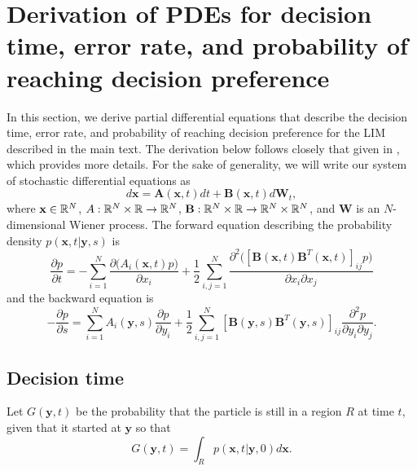\documentclass{article}
\newcommand{\mb}{\mathbf}
\begin{document}
\section{Derivation of PDEs for decision time, error rate, and probability of reaching decision preference \label{pdes_deriv}}
In this section, we derive partial differential equations that describe the decision time, error rate, and probability of reaching decision preference for the LIM described in the main text. The derivation below follows closely that given in \cite{Gardiner:2009fk}, which provides more details.
For the sake of generality, we will write our system of stochastic differential equations as
\begin{equation*}
d{\mathbf x} ={\mb A}({\mb x},t)dt+{\mb B}({\mb x},t)d{\mb W}_t,%
\end{equation*}
where ${\mb x}\in\R^N$, $A:{\mathbb{R}}^N\times {\mathbb{R}}\to{\mathbb{R}}^N$, ${\mb B}:\R^N\times\R\to\R^N\times\R^N$, and ${\mb W}$ is an $N$-dimensional Wiener process. The forward equation describing the probability density $p({\mb x},t|{\mb y},s)$ is 
\begin{equation}
\frac{\partial p}{\partial t} =-\sum_{i=1}^N\frac{\partial \big(A_i({\mb x},t)p\big)}{\partial x_i}+\frac{1}{2}\sum_{i,j=1}^N\frac{\partial^2\big([{\mb B}({\mb x},t){\mb B}^T({\mb x},t)]_{ij}p\big)}{\partial x_i\partial x_j} \label{forward}
\end{equation}
and the backward equation is 
\begin{equation}
-\frac{\partial p}{\partial s}=\sum_{i=1}^NA_i({\mb y},s)\frac{\partial p}{\partial y_i}+\frac{1}{2}\sum_{i,j=1}^N[{\mb B}({\mb y},s){\mb B}^T({\mb y},s)]_{ij}\frac{\partial^2 p}{\partial y_i\partial y_j}. \label{backward}
\end{equation}

\subsection{Decision time }
Let $G({\mathbf y},t)$ be the probability that the particle is still in a region $R$ at time $t$, given that it started at ${\mathbf y}$ so that $$G({\mathbf y},t)=\int_Rp({\mathbf x},t|{\mathbf y},0)d{\mathbf x}.$$  
\end{document}
